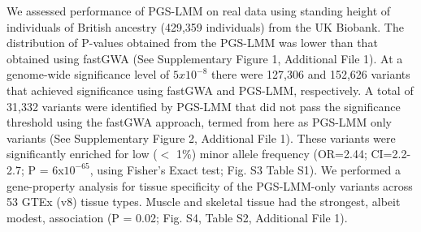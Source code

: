 \documentclass[doublespacing]{bmcart}
\begin{document}
We assessed performance of PGS-LMM on real data using standing height of individuals of British ancestry (429,359 individuals) from the UK Biobank. The distribution of P-values obtained from the PGS-LMM was lower than that obtained using fastGWA (See Supplementary  Figure 1, Additional File 1). At a genome-wide significance level of $5x10^{-8}$ there were 127,306 and 152,626 variants that achieved significance using fastGWA and PGS-LMM, respectively. A total of 31,332 variants were identified by PGS-LMM that did not pass the significance threshold using the fastGWA approach, termed from here as PGS-LMM only variants (See Supplementary  Figure 2, Additional File 1).  These variants were significantly enriched for low ($<$ 1\%) minor allele frequency (OR=2.44; CI=2.2-2.7; P = 6x$10^{-65}$, using Fisher’s Exact test; Fig. S3 Table S1).  We performed a gene-property analysis for tissue specificity of the PGS-LMM-only variants across 53 GTEx (v8) tissue types. Muscle and skeletal tissue had the strongest, albeit modest, association (P = 0.02; Fig. S4, Table S2, Additional File 1).  
\end{document}
